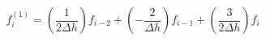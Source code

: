 \begin{equation} 
f^{{(1)}}_{i} = \left(\frac{1}{2 {\Delta h}}\right)f_{{i-2}}+ \left(- \frac{2}{{\Delta h}}\right)f_{{i-1}}+ \left(\frac{3}{2 {\Delta h}}\right)f_{{i}}
 \end{equation} 
